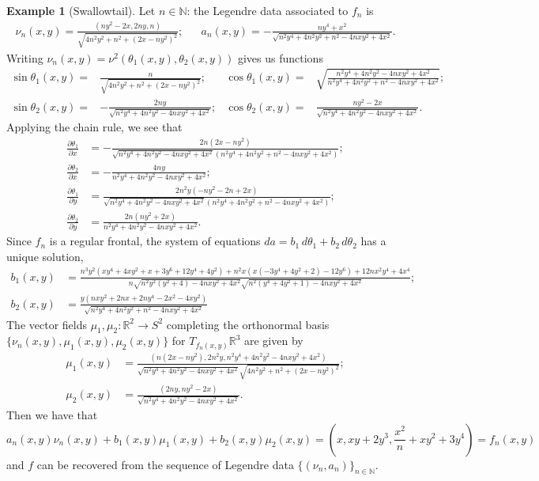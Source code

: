 \documentclass{amsart}
\theoremstyle{definition}
\theoremstyle{definition}
\newtheorem{example}{Example}
\theoremstyle{definition}
\newcommand{\mb}{\mathbb}
\begin{document}
{\begin{example}[Swallowtail]
Let $n \in \mb{N}$: the Legendre data associated to $f_n$ is
\begin{align*}
	\nu_n(x,y)=\frac{(ny^2-2x,2ny, n)}{\sqrt{4 n^2 y^2+n^2+\left(2 x-n y^2\right)^2}}; && a_n(x,y)=-\frac{n y^4+x^2}{\sqrt{n^2 y^4+4 n^2 y^2+n^2-4 n x y^2+4 x^2}}.
\end{align*}
Writing $\nu_n(x,y)=\nu^2(\theta_1(x,y),\theta_2(x,y))$ gives us functions
\begin{align*}
	\sin \theta_1(x,y)=&\frac{n}{\sqrt{4 n^2 y^2+n^2+\left(2 x-n y^2\right)^2}}; 		&\cos \theta_1(x,y)=&\sqrt{\frac{n^2 y^4+4 n^2 y^2-4 n x y^2+4 x^2}{n^2 y^4+4 n^2 y^2+n^2-4 n x y^2+4 x^2}};\\
	\sin \theta_2(x,y)=&-\frac{2 n y}{\sqrt{n^2 y^4+4 n^2 y^2-4 n x y^2+4 x^2}}; 	&\cos \theta_2(x,y)=&\frac{n y^2-2 x}{\sqrt{n^2 y^4+4 n^2 y^2-4 n x y^2+4 x^2}}.
\end{align*}
Applying the chain rule, we see that
\begin{align*}
	\frac{\partial \theta_1}{\partial x}&=-\frac{2 n \left(2 x-n y^2\right)}{\sqrt{n^2 y^4+4 n^2 y^2-4 n x y^2+4 x^2} \left(n^2 y^4+4 n^2 y^2+n^2-4 n x y^2+4 x^2\right)};
	\\
	\frac{\partial \theta_2}{\partial x}&=-\frac{4 n y}{n^2 y^4+4 n^2 y^2-4 n x y^2+4 x^2};
	\\
	\frac{\partial \theta_1}{\partial y}&=\frac{2 n^2 y \left(-n y^2-2 n+2 x\right)}{\sqrt{n^2 y^4+4 n^2 y^2-4 n x y^2+4 x^2} \left(n^2 y^4+4 n^2 y^2+n^2-4 n x y^2+4 x^2\right)};\\
	\frac{\partial \theta_2}{\partial y}&=\frac{2 n \left(n y^2+2 x\right)}{n^2 y^4+4 n^2 y^2-4 n x y^2+4 x^2}.
\end{align*}
Since $f_n$ is a regular frontal, the system of equations $da=b_1\,d\theta_1+b_2\,d\theta_2$ has a unique solution,
\begin{align*}
	b_1(x,y)&=\frac{n^3 y^2 \left(x y^4+4 x y^2+x+3 y^6+12 y^4+4 y^2\right)+n^2 x \left(x \left(-3 y^4+4 y^2+2\right)-12 y^6\right)+12 n x^2 y^4+4 x^4}{n \sqrt{n^2 y^2 \left(y^2+4\right)-4 n x y^2+4 x^2} \sqrt{n^2 \left(y^4+4 y^2+1\right)-4 n x y^2+4 x^2}};\\
	b_2(x,y)&=\frac{y \left(n x y^2+2 n x+2 n y^4-2 x^2-4 x y^2\right)}{\sqrt{n^2 y^4+4 n^2 y^2+n^2-4 n x y^2+4 x^2}}
\end{align*}
The vector fields $\mu_1, \mu_2\colon \mb{R}^2 \to S^2$ completing the orthonormal basis $\{\nu_n(x,y),\mu_1(x,y),\mu_2(x,y)\}$ for $T_{f_n(x,y)}\mb{R}^3$ are given by
\begin{align*}
	\mu_1(x,y)&=\frac{(n(2x-ny^2),2n^2y,n^2 y^4+4 n^2 y^2-4 n x y^2+4 x^2)}{\sqrt{n^2 y^4+4 n^2 y^2-4 n x y^2+4 x^2} \sqrt{4 n^2 y^2+n^2+\left(2 x-n y^2\right)^2}};
		\\
	\mu_2(x,y)&=\frac{(2 n y,n y^2-2 x)}{\sqrt{n^2 y^4+4 n^2 y^2-4 n x y^2+4 x^2}}.
\end{align*} 
Then we have that
	\[a_n(x,y)\nu_n(x,y)+b_1(x,y)\mu_1(x,y)+b_2(x,y)\mu_2(x,y)=\left(x,x y+2 y^3,\frac{x^2}{n}+x y^2+3 y^4\right)=f_n(x,y)\]
and $f$ can be recovered from the sequence of Legendre data $\{(\nu_n,a_n)\}_{n \in \mb{N}}$.
\end{example}

}
\end{document}
